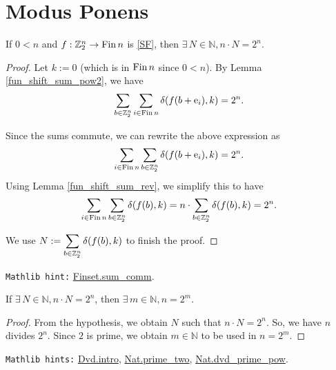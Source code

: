 \section{Modus Ponens}

\bigskip

\begin{lemma}
\label{strategy_pow2}
\leanok
If $0<n$ and $f:\mathbb{Z}_2^n \to \mathrm{Fin}\, n$ is \eqref{SF}, then $\exists\, N\in\mathbb{N}, n\cdot N = 2^n$.
\end{lemma}

\begin{proof}
  \leanok
{}
{\B Let} $k := 0$ (which is in $\mathrm{Fin}\, n$ since $0<n$). By {\B Lemma} \ref{fun_shift_sum_pow2}, we {\B have}
$$\sum_{b\in\mathbb{Z}_2^n} \sum_{i\in\mathrm{Fin}\, n} \delta(f(b+{\rm e}_i),k) = 2^n.$$

Since the {\B sums commute}, we can {\B rewrite} the above expression as
$$ \sum_{i\in\mathrm{Fin}\, n} \sum_{b\in\mathbb{Z}_2^n} \delta(f(b+{\rm e}_i),k) = 2^n.$$
Using {\B Lemma} \ref{fun_shift_sum_rev}, we {\B simplify} this to have
$$\sum_{i\in\mathrm{Fin}\, n} \sum_{b\in\mathbb{Z}_2^n} \delta(f(b),k) = n \cdot \sum_{b\in\mathbb{Z}_2^n} \delta(f(b),k) = 2^n.$$

We {\B use} $N := \displaystyle\sum_{b\in\mathbb{Z}_2^n} \delta(f(b),k)$ to finish the proof.
\end{proof}

\verb|Mathlib hint:| \href{https://leanprover-community.github.io/mathlib4_docs/Mathlib/Algebra/BigOperators/Group/Finset/Sigma.html#Finset.sum_comm}{Finset.sum\_comm}.

\bigskip

\begin{lemma}
\label{mul_pow2}
\leanok
If $\exists\, N\in\mathbb{N}, n\cdot N = 2^n$, then $\exists\, m\in\mathbb{N}, n = 2^m$.
\end{lemma}

\begin{proof}
  \leanok
From the hypothesis, we {\B obtain} $N$ such that $n\cdot N = 2^n$. So, we {\B have} $n$ {\B divides} $2^n$. Since {\B  $2$ is prime}, we {\B obtain} $m\in\mathbb{N}$ to be {\B used} in $n = 2^m$.
\end{proof}

\verb|Mathlib hints:| \href{https://leanprover-community.github.io/mathlib4_docs/Mathlib/Algebra/Divisibility/Basic.html#Dvd.intro}{Dvd.intro}, \href{https://leanprover-community.github.io/mathlib4_docs/Mathlib/Data/Nat/Prime/Defs.html#Nat.prime_two}{Nat.prime\_two}, \href{https://leanprover-community.github.io/mathlib4_docs/Mathlib/Data/Nat/Prime/Basic.html#Nat.dvd_prime_pow}{Nat.dvd\_prime\_pow}.

